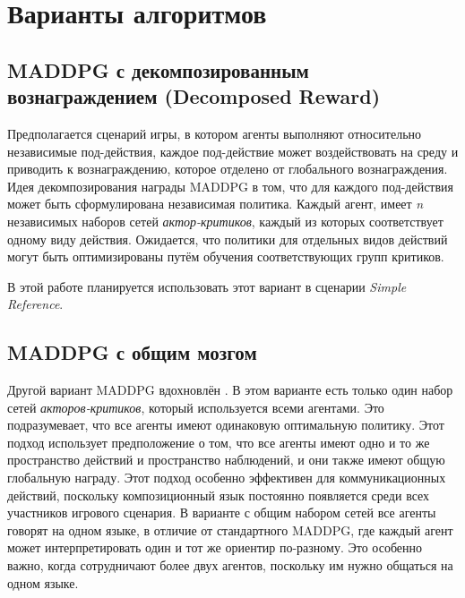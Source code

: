 \section{Варианты алгоритмов}

\subsection{MADDPG с декомпозированным вознаграждением (Decomposed Reward)}

Предполагается сценарий игры, в котором агенты выполняют относительно независимые под-действия, каждое под-действие может воздействовать на среду и приводить к вознаграждению, которое отделено от глобального вознаграждения. Идея декомпозирования награды MADDPG в том, что для каждого под-действия может быть сформулирована независимая политика. Каждый агент, имеет \textit{n} независимых наборов сетей \textit{актор-критиков}, каждый из которых соответствует одному виду действия. Ожидается, что политики для отдельных видов действий могут быть оптимизированы путём обучения соответствующих групп критиков.

В этой работе планируется использовать этот вариант в сценарии \textit{Simple Reference}.

\subsection{MADDPG с общим мозгом}

Другой вариант MADDPG вдохновлён \cite{mordatch2017emergence}. В этом варианте есть только один набор сетей \textit{акторов-критиков}, который используется всеми агентами. Это подразумевает, что все агенты имеют одинаковую оптимальную политику. Этот подход использует предположение о том, что все агенты имеют одно и то же пространство действий и пространство наблюдений, и они также имеют общую глобальную награду. Этот подход особенно эффективен для коммуникационных действий, поскольку композиционный язык постоянно появляется среди всех участников игрового сценария. В варианте с общим набором сетей все агенты говорят на одном языке, в отличие от стандартного MADDPG, где каждый агент может интерпретировать один и тот же ориентир по-разному. Это особенно важно, когда сотрудничают более двух агентов, поскольку им нужно общаться на одном языке.
